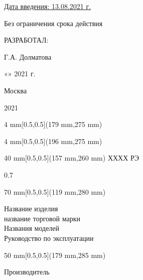 \documentclass[a4paper,fontsize=14bp]{article}
\begin{document}
  \vspace{3cm}
  
  \fontsize{12}{12}\selectfont
  \begin{flushright}
   \underline{Дата введения: 13.08.2021 г.}\hspace{0.8cm}
  
   Без ограничения срока действия
  
  \end{flushright}
  
  \quad
    
  \quad
 
  \begin{flushright}
  РАЗРАБОТАЛ: \hspace{1.8cm}
  
  \underline{\hspace{3.5cm}}Г.А. Долматова

   «\underline{\hspace{0.8cm}}» \underline{\hspace{2.3cm}} 2021 г.\hspace{0.5cm} 
   \quad
  \end{flushright}
  
  \begin{center}
    \fontsize{12}{12}\selectfont
   \vspace{5cm}
    Москва
   
    2021
   \end{center}
\newpage 
{}
{\setmainfont{GOST2304 Type A}
{\sl
\begin{textblock*}{4 mm}[0.5,0.5](179 mm,275 mm)%
\noindent%
\large {\thepage} %
\end{textblock*}
\begin{textblock*}{4 mm}[0.5,0.5](196 mm,275 mm)%
\noindent%
\large{\pageref{LastPage}} %
\end{textblock*}
\begin{textblock*}{40 mm}[0.5,0.5](157 mm,260 mm)%
\noindent%
\huge{ХХХХ РЭ} 
\end{textblock*}
\begin{spacing}{0.7} %
\begin{textblock*}{70 mm}[0.5,0.5](119 mm,280 mm)%
\noindent%
\begin{center}
\Large {Название изделия\\
название торговой марки\\
Названия моделей\\
Руководство по эксплуатации}
\end{center}
\end{textblock*}
\end{spacing}
\begin{textblock*}{50 mm}[0.5,0.5](179 mm,285 mm)%
\noindent%
\begin{center}
\Large {Производитель}
\end{center}
\end{textblock*}
}}
\setlength{\parindent}{1.25cm} %
\end{document}
